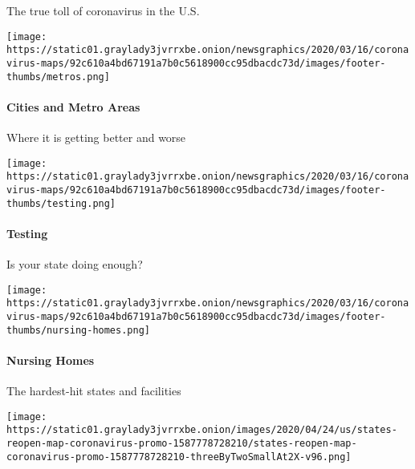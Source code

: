 The true toll of coronavirus in the U.S.

\href{https://www.nytimes3xbfgragh.onion/interactive/2020/04/23/upshot/five-ways-to-monitor-coronavirus-outbreak-us.html}{}

\texttt{[image: https://static01.graylady3jvrrxbe.onion/newsgraphics/2020/03/16/coronavirus-maps/92c610a4bd67191a7b0c5618900cc95dbacdc73d/images/footer-thumbs/metros.png]}

\hypertarget{cities-and-metro-areas}{%
\paragraph{Cities and Metro Areas}\label{cities-and-metro-areas}}

Where it is getting better and worse

\href{https://www.nytimes3xbfgragh.onion/interactive/2020/us/coronavirus-testing.html}{}

\texttt{[image: https://static01.graylady3jvrrxbe.onion/newsgraphics/2020/03/16/coronavirus-maps/92c610a4bd67191a7b0c5618900cc95dbacdc73d/images/footer-thumbs/testing.png]}

\hypertarget{testing}{%
\paragraph{Testing}\label{testing}}

Is your state doing enough?

\href{https://www.nytimes3xbfgragh.onion/interactive/2020/us/coronavirus-nursing-homes.html}{}

\texttt{[image: https://static01.graylady3jvrrxbe.onion/newsgraphics/2020/03/16/coronavirus-maps/92c610a4bd67191a7b0c5618900cc95dbacdc73d/images/footer-thumbs/nursing-homes.png]}

\hypertarget{nursing-homes}{%
\paragraph{Nursing Homes}\label{nursing-homes}}

The hardest-hit states and facilities

\href{https://www.nytimes3xbfgragh.onion/interactive/2020/us/states-reopen-map-coronavirus.html}{}

\texttt{[image: https://static01.graylady3jvrrxbe.onion/images/2020/04/24/us/states-reopen-map-coronavirus-promo-1587778728210/states-reopen-map-coronavirus-promo-1587778728210-threeByTwoSmallAt2X-v96.png]}

